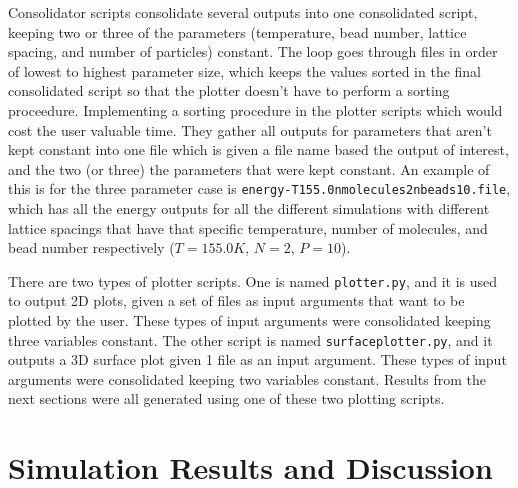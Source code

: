 \documentclass{ece}
\begin{document}
Consolidator scripts consolidate several outputs into one consolidated script, keeping two or three of the parameters (temperature, bead number, lattice spacing, and number of particles) constant. The loop goes through files in order of lowest to highest parameter size, which keeps the values sorted in the final consolidated script so that the plotter doesn't have to perform a sorting proceedure. Implementing a sorting procedure in the plotter scripts which would cost the user valuable time. They gather all outputs for parameters that aren't kept constant into one file which is given a file name based the output of interest, and the two (or three) the parameters that were kept constant. An example of this is for the three parameter case is \texttt{energy-T155.0nmolecules2nbeads10.file}, which has all the energy outputs for all the different simulations with different lattice spacings that have that specific temperature, number of molecules, and bead number respectively (\begin{math} T = 155.0 K \end{math}, \begin{math} N = 2 \end{math}, \begin{math} P = 10 \end{math}). 

There are two types of plotter scripts. One is named \texttt{plotter.py}, and it is used to output 2D plots, given a set of files as input arguments that want to be plotted by the user. These types of input arguments were consolidated keeping three variables constant. The other script is named \texttt{surfaceplotter.py}, and it outputs a 3D surface plot given 1 file as an input argument. These types of input arguments were consolidated keeping two variables constant. Results from the next sections were all generated using one of these two plotting scripts.

\vspace{1cm}

\section{Simulation Results and Discussion}
\end{document}
